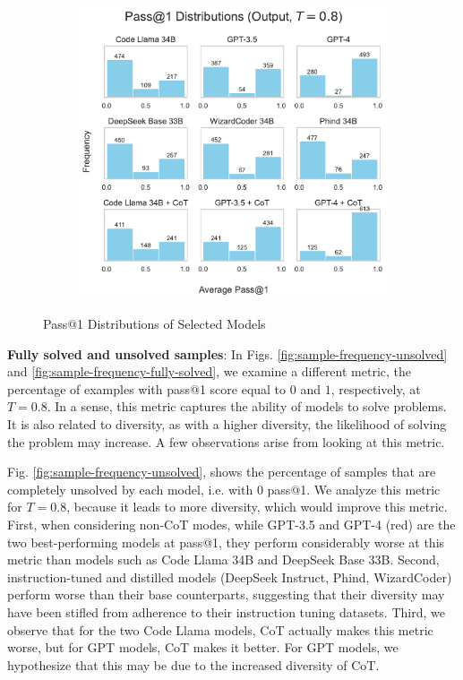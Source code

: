 \begin{figure}[h]
\begin{subfigure}[b]{0.49\textwidth}
         \includegraphics[width=\textwidth]{figs/diversity/sample_pass1_distributions_output_0.8.pdf}
     \end{subfigure}
     \caption{Pass@1 Distributions of Selected Models}
     \label{fig:pass1-distributions-selected}
\end{figure}


\textbf{Fully solved and unsolved samples}: In Figs. \ref{fig:sample-frequency-unsolved} and \ref{fig:sample-frequency-fully-solved}, we examine a different metric, the percentage of examples with pass@1 score equal to $0$ and $1$, respectively, at $T=0.8$. In a sense, this metric captures the ability of models to solve problems. It is also related to diversity, as with a higher diversity, the likelihood of solving the problem may increase. A few observations arise from looking at this metric.

Fig. \ref{fig:sample-frequency-unsolved}, shows the percentage of samples that are completely unsolved by each model, i.e. with $0$ pass@1. We analyze this metric for $T=0.8$, because it leads to more diversity, which would improve this metric. First, when considering non-CoT modes, while GPT-3.5 and GPT-4 (red) are the two best-performing models at pass@1, they perform considerably worse at this metric than models such as Code Llama 34B and DeepSeek Base 33B. Second, instruction-tuned and distilled models (DeepSeek Instruct, Phind, WizardCoder) perform worse than their base counterparts, suggesting that their diversity may have been stifled from adherence to their instruction tuning datasets. Third, we observe that for the two Code Llama models, CoT actually makes this metric worse, but for GPT models, CoT makes it better. For GPT models, we hypothesize that this may be due to the increased diversity of CoT. 

